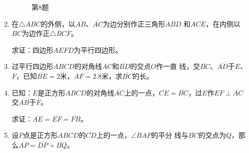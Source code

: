 \begin{enumerate}
\begin{figure}
\begin{minipage}[t]{0.48\linewidth}
\begin{tikzpicture}[>=latex, scale=1]


    \end{tikzpicture}
    \caption*{第8题}
    \end{minipage}
    \end{figure}

\item 在$\triangle ABC$的外侧，以$\overline{AB}$、$\overline{AC}$为边分别作正三角形$ABD$
和$ACE$，在内侧以$BC$为边作正$\triangle BCF$。

求证：四边形$AEFD$为平行四边形。
\item 过平行四边形$ABCD$的对角线$\overline{AC}$和$\overline{BD}$的交点$O$作一直
线，交$\overline{BC}$、$\overline{AD}$于$E$、$F$，已知$\overline{BE}=2$米，$\overline{AF=2.8}$米，求$\overline{BC}$的长。
\item 已知：$E$是正方形$ABCD$的对角线$\overline{AC}$上的一点，$\overline{CE}=\overline{BC}$，过$E$作$EF\perp \overline{AC}$交$\overline{AB}$于$F$。

求证：$\overline{AE}=\overline{EF}=\overline{FB}$。

\item 设$P$点是正方形$ABCD$的$\overline{CD}$上的一点，$\angle BAP$的平分
线与$\overline{BC}$的交点为$Q$，那么$\overline{AP}=\overline{DP}+\overline{BQ}$。

\begin{figure}
    \begin{minipage}[t]{0.48\linewidth}
    \centering
\begin{tikzpicture}[>=latex, scale=1]


\end{tikzpicture}
\end{minipage}
\end{figure}
\end{enumerate}
